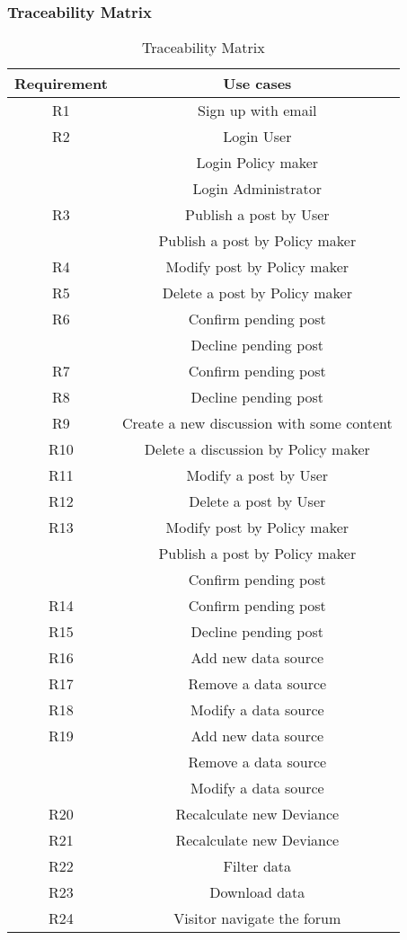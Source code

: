 \subsubsection{Traceability Matrix}
    \begin{longtable}{c|c}
     \caption{Traceability Matrix}
        \label{tab:traceability_matrix}\\
       \textbf{Requirement}  & \textbf{Use cases} \\ \hline \hline
            R1 & Sign up with email\\ \hline
            R2 & Login User\\ & Login Policy maker\\ & Login Administrator\\ \hline
            R3 & Publish a post by User \\ & Publish a post by Policy maker\\ \hline
            R4 & Modify post by Policy maker\\ \hline
            R5 & Delete a post by Policy maker\\ \hline
            R6 & Confirm pending post \\ & Decline pending post \\ \hline
            R7 & Confirm pending post\\ \hline
            R8 & Decline pending post\\ \hline
            R9 & Create a new discussion with some content\\ \hline
            R10 & Delete a discussion by Policy maker\\ \hline
            R11 & Modify a post by User\\ \hline
            R12 & Delete a post by User\\ \hline
            R13 & Modify post by Policy maker\\  & Publish a post by Policy maker\\ & Confirm pending post\\ \hline
            R14 & Confirm pending post\\ \hline
            R15 & Decline pending post\\ \hline
            R16 & Add new data source\\ \hline
            R17 & Remove a data source \\ \hline
            R18 & Modify a data source\\ \hline
            R19 & Add new data source\\ & Remove a data source \\ &  Modify a data source\\\hline
            R20 & Recalculate new Deviance\\ \hline
            R21 & Recalculate new Deviance\\\hline
            R22 & Filter data\\\hline
            R23 & Download data\\\hline
            R24 & Visitor navigate the forum\\\hline\hline
    \end{longtable}
    
